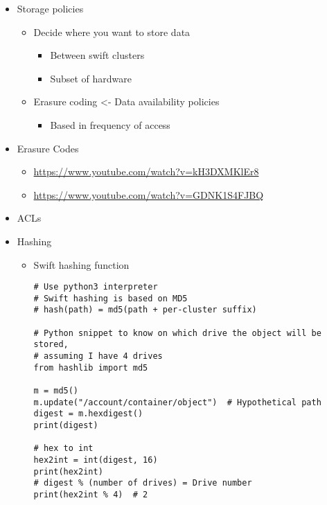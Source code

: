 \documentclass{article}
\begin{document}
\begin{itemize}
\item Storage policies
\begin{itemize}
\item Decide where you want to store data
\begin{itemize}
\item Between swift clusters
\item Subset of hardware
\end{itemize}
\item Erasure coding <- Data availability policies
\begin{itemize}
\item Based in frequency of access
\end{itemize}
\end{itemize}

\item Erasure Codes
\begin{itemize}
\item \url{https://www.youtube.com/watch?v=kH3DXMKlEr8}
\item \url{https://www.youtube.com/watch?v=GDNK1S4FJBQ}
\end{itemize}

\item ACLs

\item Hashing
\begin{itemize}
\item Swift hashing function
\begin{verbatim}
# Use python3 interpreter
# Swift hashing is based on MD5
# hash(path) = md5(path + per-cluster suffix)

# Python snippet to know on which drive the object will be stored,
# assuming I have 4 drives
from hashlib import md5

m = md5()
m.update("/account/container/object")  # Hypothetical path
digest = m.hexdigest()
print(digest)

# hex to int
hex2int = int(digest, 16)
print(hex2int)
# digest % (number of drives) = Drive number
print(hex2int % 4)  # 2
\end{verbatim}
\end{itemize}
\end{itemize}
\end{document}
